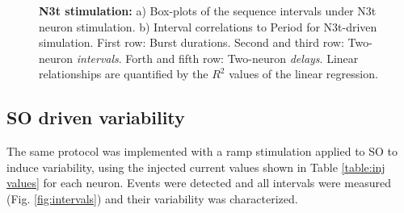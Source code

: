 \begin{figure}[hbt!]
\begin{minipage}[b]{0.53\textwidth}
\begin{minipage}[b]{\textwidth}
		\end{minipage}
	\end{minipage}
	\caption{\textbf{N3t stimulation:} a) Box-plots of the sequence intervals under N3t neuron stimulation. b) Interval correlations to Period for N3t-driven simulation. First row: Burst durations. Second and third row: Two-neuron \textit{intervals}. Forth and fifth row: Two-neuron \textit{delays}. Linear relationships are quantified by the $R^2$ values of the linear regression.}
	\label{fig:invariants n3t}
\end{figure}





\subsection{SO driven variability}
\label{subsec:so driven}

The same protocol was implemented with a ramp stimulation applied to SO to induce variability, using the injected current values shown in Table \ref{table:inj values} for each neuron. Events were detected and all intervals were measured (Fig. \ref{fig:intervals}) and their variability was characterized. %

